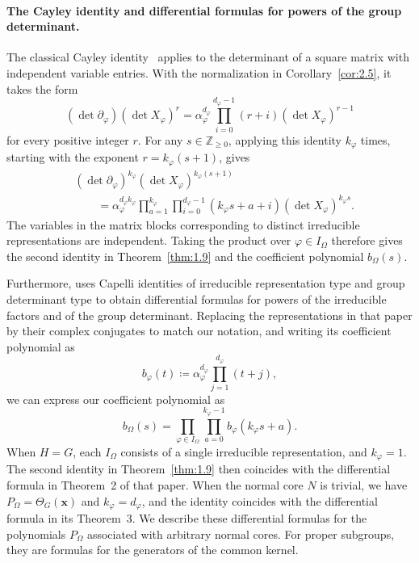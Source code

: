 \documentclass[12pt,a4paper]{article}
\theoremstyle{definition}
\numberwithin{definition}{section}
\begin{document}
\paragraph{The Cayley identity and differential formulas for powers of the group determinant.}
The classical Cayley identity~\cite[Theorem~2.1]{CaraccioloSokalSportiello2013}
applies to the determinant of a square matrix with independent variable entries.
With the normalization in Corollary~\ref{cor:2.5}, it takes the form
\[
(\det\partial_\varphi)(\det X_\varphi)^r
=\alpha_\varphi^{d_\varphi}
\prod_{i=0}^{d_\varphi-1}(r+i)(\det X_\varphi)^{r-1}
\]
for every positive integer $r$.
For any $s\in\mathbb Z_{\ge0}$, applying this identity $k_\varphi$ times,
starting with the exponent $r=k_\varphi(s+1)$, gives
\[
\begin{aligned}
& (\det\partial_\varphi)^{k_\varphi}
(\det X_\varphi)^{k_\varphi(s+1)}\\
&\qquad=
\alpha_\varphi^{d_\varphi k_\varphi}
\prod_{a=1}^{k_\varphi}\prod_{i=0}^{d_\varphi-1}
(k_\varphi s+a+i)(\det X_\varphi)^{k_\varphi s}.
\end{aligned}
\]
The variables in the matrix blocks corresponding to distinct irreducible
representations are independent.
Taking the product over $\varphi\in I_\Omega$ therefore gives the second
identity in Theorem~\ref{thm:1.9} and the coefficient polynomial $b_\Omega(s)$.

Furthermore, \cite[Theorems~2 and~3]{YI2026} uses Capelli identities of
irreducible representation type and group determinant type to obtain
differential formulas for powers of the irreducible factors and of the
group determinant.
Replacing the representations in that paper by their complex conjugates
to match our notation, and writing its coefficient polynomial as
\[
b_\varphi(t)\coloneqq
\alpha_\varphi^{d_\varphi}
\prod_{j=1}^{d_\varphi}(t+j),
\]
we can express our coefficient polynomial as
\[
b_\Omega(s)
=\prod_{\varphi\in I_\Omega}
\prod_{a=0}^{k_\varphi-1}b_\varphi(k_\varphi s+a).
\]
When $H=G$, each $I_\Omega$ consists of a single irreducible representation,
and $k_\varphi=1$. The second identity in Theorem~\ref{thm:1.9} then
coincides with the differential formula in Theorem~2 of that paper.
When the normal core $N$ is trivial, we have
$P_\Omega=\Theta_G(\bm x)$ and $k_\varphi=d_\varphi$, and the identity
coincides with the differential formula in its Theorem~3.
We describe these differential formulas for the polynomials $P_\Omega$
associated with arbitrary normal cores. For proper subgroups, they are
formulas for the generators of the common kernel.
\end{document}
